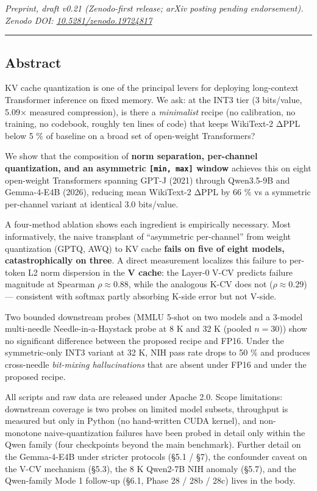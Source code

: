 \emph{Preprint, draft v0.21 (Zenodo-first release; arXiv posting pending
endorsement).}\\
\emph{Zenodo DOI:
\href{https://doi.org/10.5281/zenodo.19724817}{10.5281/zenodo.19724817}}

\begin{center}\rule{0.5\linewidth}{0.5pt}\end{center}

\subsection{Abstract}\label{abstract}

KV cache quantization is one of the principal levers for deploying
long-context Transformer inference on fixed memory. We ask: at the INT3
tier (3 bits/value, 5.09× measured compression), is there a
\emph{minimalist} recipe (no calibration, no training, no codebook,
roughly ten lines of code) that keeps WikiText-2 ΔPPL below 5 \% of
baseline on a broad set of open-weight Transformers?

We show that the composition of \textbf{norm separation, per-channel
quantization, and an asymmetric \texttt{{[}min,\ max{]}} window}
achieves this on eight open-weight Transformers spanning GPT-J (2021)
through Qwen3.5-9B and Gemma-4-E4B (2026), reducing mean WikiText-2 ΔPPL
by 66 \% vs a symmetric per-channel variant at identical 3.0 bits/value.

A four-method ablation shows each ingredient is empirically necessary.
Most informatively, the naive transplant of ``asymmetric per-channel''
from weight quantization (GPTQ, AWQ) to KV cache \textbf{fails on five
of eight models, catastrophically on three}. A direct measurement
localizes this failure to per-token L2 norm dispersion in the \textbf{V
cache}: the Layer-0 V-CV predicts failure magnitude at Spearman
\(\rho \approx 0.88\), while the analogous K-CV does not
(\(\rho \approx 0.29\)) --- consistent with softmax partly absorbing
K-side error but not V-side.

Two bounded downstream probes (MMLU 5-shot on two models and a 3-model
multi-needle Needle-in-a-Haystack probe at 8 K and 32 K (pooled
\(n = 30\))) show no significant difference between the proposed recipe
and FP16. Under the symmetric-only INT3 variant at 32 K, NIH pass rate
drops to 50 \% and produces cross-needle \emph{bit-mixing
hallucinations} that are absent under FP16 and under the proposed
recipe.

All scripts and raw data are released under Apache 2.0. Scope
limitations: downstream coverage is two probes on limited model subsets,
throughput is measured but only in Python (no hand-written CUDA kernel),
and non-monotone naive-quantization failures have been probed in detail
only within the Qwen family (four checkpoints beyond the main
benchmark). Further detail on the Gemma-4-E4B under stricter protocols
(§5.1 / §7), the confounder caveat on the V-CV mechanism (§5.3), the 8 K
Qwen2-7B NIH anomaly (§5.7), and the Qwen-family Mode 1 follow-up (§6.1,
Phase 28 / 28b / 28c) lives in the body.

